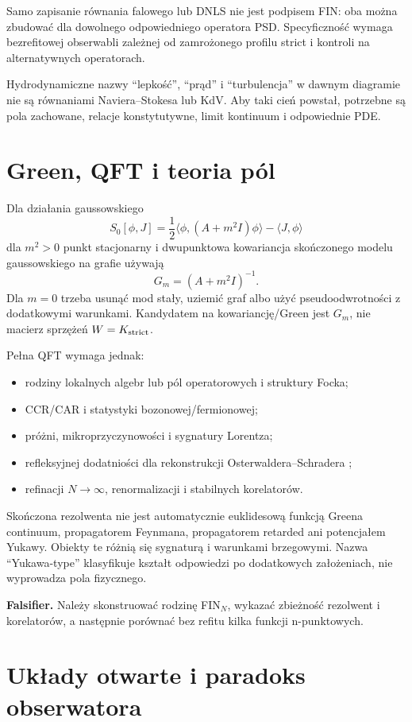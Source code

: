 \documentclass[11pt,a4paper]{article}
\begin{document}
Samo zapisanie równania falowego lub DNLS nie jest podpisem FIN: oba można zbudować dla dowolnego odpowiedniego operatora PSD. Specyficzność wymaga bezrefitowej obserwabli zależnej od zamrożonego profilu strict i kontroli na alternatywnych operatorach.

Hydrodynamiczne nazwy ``lepkość'', ``prąd'' i ``turbulencja'' w dawnym diagramie nie są równaniami Naviera--Stokesa lub KdV. Aby taki cień powstał, potrzebne są pola zachowane, relacje konstytutywne, limit kontinuum i odpowiednie PDE.

\section{Green, QFT i teoria pól}

Dla działania gaussowskiego
\[
S_0[\phi,J]=\frac12\langle\phi,(A+m^2I)\phi\rangle-\langle J,\phi\rangle
\]
dla $m^2>0$ punkt stacjonarny i dwupunktowa kowariancja skończonego modelu gaussowskiego na grafie używają
\[
G_m=(A+m^2I)^{-1}.
\]
Dla $m=0$ trzeba usunąć mod stały, uziemić graf albo użyć pseudoodwrotności z dodatkowymi warunkami. Kandydatem na kowariancję/Green jest $G_m$, nie macierz sprzężeń $W=K_{\rm strict}$.

Pełna QFT wymaga jednak:
\begin{itemize}
\item rodziny lokalnych algebr lub pól operatorowych i struktury Focka;
\item CCR/CAR i statystyki bozonowej/fermionowej;
\item próżni, mikroprzyczynowości i sygnatury Lorentza;
\item refleksyjnej dodatniości dla rekonstrukcji Osterwaldera--Schradera \cite{OsterwalderSchrader};
\item refinacji $N\to\infty$, renormalizacji i stabilnych korelatorów.
\end{itemize}
Skończona rezolwenta nie jest automatycznie euklidesową funkcją Greena continuum, propagatorem Feynmana, propagatorem retarded ani potencjałem Yukawy. Obiekty te różnią się sygnaturą i warunkami brzegowymi. Nazwa ``Yukawa-type'' klasyfikuje kształt odpowiedzi po dodatkowych założeniach, nie wyprowadza pola fizycznego.

\textbf{Falsifier.} Należy skonstruować rodzinę FIN$_N$, wykazać zbieżność rezolwent i korelatorów, a następnie porównać bez refitu kilka funkcji n-punktowych.

\section{Układy otwarte i paradoks obserwatora}
\end{document}
